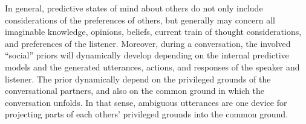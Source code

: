 \documentclass[10pt,a4paper]{article}
\begin{document}
In general, predictive states of mind about others do not only include considerations of the preferences of others, but generally may concern all imaginable knowledge, opinions, beliefs, current train of thought considerations, and preferences of the listener.
Moreover, during a conversation, the involved ``social'' priors will dynamically develop depending on the internal predictive models and the generated utterances, actions, and responses of the speaker and listener. 
The prior dynamically depend on the privileged grounds of the conversational partners, and also on the common ground in which the conversation unfolds.
In that sense, ambiguous utterances are one device for projecting parts of each others' privileged grounds into the common ground. 




\setlength{\bibleftmargin}{.125in}
\setlength{\bibindent}{-\bibleftmargin}


\end{document}
